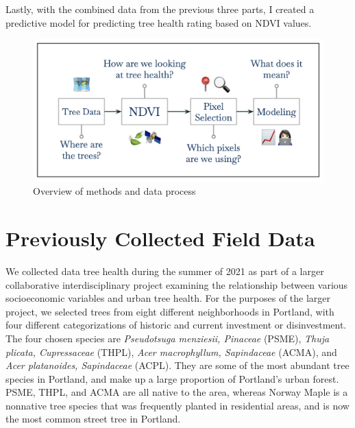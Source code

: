 \documentclass[12pt,twoside]{reedthesis}
\begin{document}
Lastly, with the combined data from the previous three parts, I created
a predictive model for predicting tree health rating based on NDVI
values.
\begin{figure}

{\centering \includegraphics[width=0.95\linewidth]{figure/methods-overview} 

}

\caption{Overview of methods and data process}\label{fig:methods-overview-fig}
\end{figure}
\hypertarget{previously-collected-field-data}{%
\section{Previously Collected Field Data}\label{previously-collected-field-data}}

We collected data tree health during the summer of 2021 as part of a
larger collaborative interdisciplinary project examining the
relationship between various socioeconomic variables and urban tree
health. For the purposes of the larger project, we selected trees from
eight different neighborhoods in Portland, with four different
categorizations of historic and current investment or disinvestment. The
four chosen species are \emph{Pseudotsuga menziesii, Pinaceae} (PSME), \emph{Thuja
plicata, Cupressaceae} (THPL), \emph{Acer macrophyllum, Sapindaceae} (ACMA),
and \emph{Acer platanoides, Sapindaceae} (ACPL). They are some of the most
abundant tree species in Portland, and make up a large proportion of
Portland's urban forest. PSME, THPL, and ACMA are all native to the
area, whereas Norway Maple is a nonnative tree species that was
frequently planted in residential areas, and is now the most common
street tree in Portland.
\end{document}
